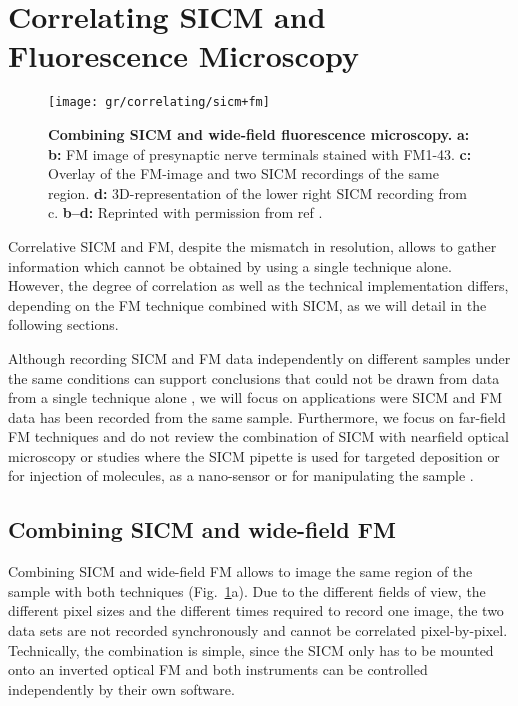 \section{Correlating SICM and Fluorescence Microscopy}
\label{sec:correlating-sicm-and-fm}

\begin{figure}
  \texttt{[image: gr/correlating/sicm+fm]}
  \caption{%
    \textbf{Combining SICM and wide-field fluorescence microscopy.}
    \textbf{a:}
    \textbf{b:} FM image of presynaptic nerve terminals stained with
    FM1-43. \textbf{c:} Overlay of the FM-image and two SICM recordings of the
    same region. \textbf{d:} 3D-representation of the lower right SICM
    recording from c.
    \textbf{b--d:} Reprinted with permission from ref \cite{Scheenen2015}.
  }
  \label{fig:sicm+fm}
\end{figure}

Correlative SICM and FM, despite the mismatch in resolution, allows to gather
information which cannot be obtained by using a single technique
alone. However, the degree of correlation as well as the technical
implementation differs, depending on the FM technique combined with SICM, as
we will detail in the following sections.

Although recording SICM and FM data independently on different samples under
the same conditions can support conclusions that could not be drawn from data
from a single technique alone \cite{Gesper2017,Lee2013,Lyon2009}, we will
focus on applications were SICM and FM data has been recorded from the same
sample. Furthermore, we focus on far-field FM techniques and do not review the
combination of SICM with nearfield optical microscopy  
\cite{Korchev2000,Shevchuk2001,Rothery2003,Bruckbauer2002} or studies where
the SICM pipette is used for targeted deposition 
\cite{Ying2002,Bruckbauer2007,Bruckbauer2010,Hennig2015} or for injection 
\cite{Hennig2015a} of molecules, as a nano-sensor \cite{Piper2006} or for manipulating the sample
\cite{Fuentes2012,Wang2020}.


\subsection{Combining SICM and wide-field FM}
\label{sec:SICM+widefield}
Combining SICM and wide-field FM allows to image the same region of the sample
with both techniques (Fig.~\ref{fig:sicm+fm}a). Due to the different fields of
view, the different pixel sizes and the different times required to record one
image, the two data sets are not recorded synchronously and cannot be
correlated pixel-by-pixel. Technically, the combination is simple, since
the SICM only has to be mounted onto an inverted optical FM and both
instruments can be controlled independently by their own software.

